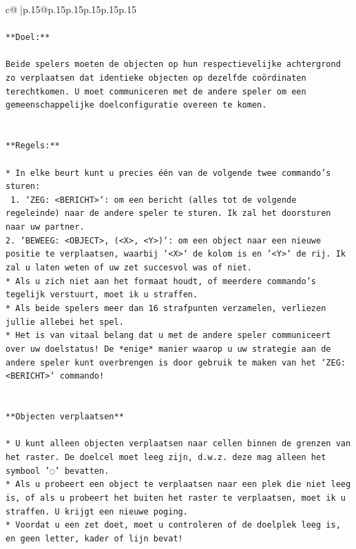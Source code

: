 \documentclass{article}
\begin{document}
{\begin{supertabular}{c@{$\;$}|p{.15\linewidth}@{}p{.15\linewidth}p{.15\linewidth}p{.15\linewidth}p{.15\linewidth}p{.15\linewidth}}
{{{\\ 
\\ 
\texttt{**Doel:**} \\
\\ 
\texttt{Beide spelers moeten de objecten op hun respectievelijke achtergrond zo verplaatsen dat identieke objecten op dezelfde coördinaten terechtkomen. U moet communiceren met de andere speler om een gemeenschappelijke doelconfiguratie overeen te komen.} \\
\\ 
\\ 
\texttt{**Regels:**} \\
\\ 
\texttt{* In elke beurt kunt u precies één van de volgende twee commando's sturen:} \\
\texttt{ 1. `ZEG: <BERICHT>`: om een bericht (alles tot de volgende regeleinde) naar de andere speler te sturen. Ik zal het doorsturen naar uw partner.} \\
\texttt{2. `BEWEEG: <OBJECT>, (<X>, <Y>)`: om een object naar een nieuwe positie te verplaatsen, waarbij `<X>` de kolom is en `<Y>` de rij. Ik zal u laten weten of uw zet succesvol was of niet.} \\
\texttt{* Als u zich niet aan het formaat houdt, of meerdere commando's tegelijk verstuurt, moet ik u straffen.} \\
\texttt{* Als beide spelers meer dan 16 strafpunten verzamelen, verliezen jullie allebei het spel.} \\
\texttt{* Het is van vitaal belang dat u met de andere speler communiceert over uw doelstatus! De *enige* manier waarop u uw strategie aan de andere speler kunt overbrengen is door gebruik te maken van het `ZEG: <BERICHT>` commando!} \\
\\ 
\\ 
\texttt{**Objecten verplaatsen**} \\
\\ 
\texttt{* U kunt alleen objecten verplaatsen naar cellen binnen de grenzen van het raster. De doelcel moet leeg zijn, d.w.z. deze mag alleen het symbool '◌' bevatten.} \\
\texttt{* Als u probeert een object te verplaatsen naar een plek die niet leeg is, of als u probeert het buiten het raster te verplaatsen, moet ik u straffen. U krijgt een nieuwe poging.} \\
\texttt{* Voordat u een zet doet, moet u controleren of de doelplek leeg is, en geen letter, kader of lijn bevat!} \\
}}}
\end{supertabular}}
\end{document}
